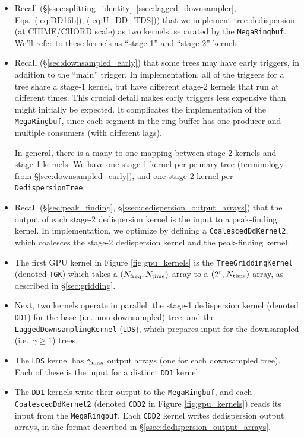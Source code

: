 \documentclass{article}
\numberwithin{equation}{section}   %
\begin{document}
\begin{itemize}

\item
Recall (\S\ref{ssec:splitting_identity}--\ref{ssec:lagged_downsampler}, Eqs.\ (\ref{eq:DD16b}), (\ref{eq:U_DD_TDS}))
that we implement tree dedispersion (at CHIME/CHORD scale) as two kernels, separated by the {\tt MegaRingbuf}.
We'll refer to these kernels as ``stage-1'' and ``stage-2'' kernels.

\item
Recall (\S\ref{sec:downsampled_early}) that some trees may have early triggers, in addition to the ``main'' trigger.
In implementation, all of the triggers for a tree share a stage-1 kernel, but have different stage-2 kernels that
run at different times.
This crucial detail makes early triggers less expensive than might initially be expected.
It complicates the implementation of the {\tt MegaRingbuf}, since each segment in the ring buffer
has one producer and multiple consumers (with different lags).

In general, there is a many-to-one mapping between stage-2 kernels and stage-1 kernels.
We have one stage-1 kernel per primary tree (terminology from \S\ref{sec:downsampled_early}),
and one stage-2 kernel per {\tt DedispersionTree}.

\item 
Recall (\S\ref{sec:peak_finding}, \S\ref{ssec:dedispersion_output_arrays}) that the output of each
stage-2 dedispersion kernel is the input to a peak-finding kernel.
In implementation, we optimize by defining a {\tt CoalescedDdKernel2}, which coalesces the
stage-2 dedispersion kernel and the peak-finding kernel.

\item
The first GPU kernel in Figure \ref{fig:gpu_kernels} is the {\tt TreeGriddingKernel} (denoted {\tt TGK})
which takes a $(N_{\rm freq}, N_{\rm time})$ array to a $(2^r, N_{\rm time})$ array, as described in \S\ref{sec:gridding}.

\item
Next, two kernels operate in parallel: the stage-1 dedispersion kernel (denoted {\tt DD1}) for the base (i.e.\ non-downsampled) tree,
and the {\tt LaggedDownsamplingKernel} ({\tt LDS}), which prepares input for the downsampled (i.e.\ $\gamma \ge 1$) trees.

\item
The {\tt LDS} kernel has $\gamma_{\rm max}$ output arrays (one for each downsampled tree).
Each of these is the input for a distinct {\tt DD1} kernel.

\item
The {\tt DD1} kernels write their output to the {\tt MegaRingbuf}, and each {\tt CoalescedDdKernel2}
(denoted {\tt CDD2} in Figure \ref{fig:gpu_kernels}) reads its input from the {\tt MegaRingbuf}.
Each {\tt CDD2} kernel writes dedispersion output arrays, in the format described in \S\ref{ssec:dedispersion_output_arrays}.

\end{itemize}
\end{document}

